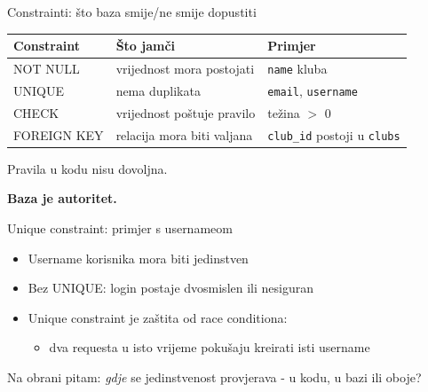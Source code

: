 	\begin{frame}{Constrainti: što baza smije/ne smije dopustiti}
		\begin{center}
			\small
			\begin{tabular}{lll}
				\toprule
				\textbf{Constraint} & \textbf{Što jamči} & \textbf{Primjer} \\
				\midrule
				NOT NULL & vrijednost mora postojati & \texttt{name} kluba \\
				UNIQUE & nema duplikata & \texttt{email}, \texttt{username} \\
				CHECK & vrijednost poštuje pravilo & težina $>$ 0 \\
				FOREIGN KEY & relacija mora biti valjana & \texttt{club\_id} postoji u \texttt{clubs} \\
				\bottomrule
			\end{tabular}
		\end{center}
	\end{frame}

	\begin{frame}{}
		\begin{center}
			{\Large Pravila u kodu nisu dovoljna.}

			\vspace{1em}
			{\huge \textbf{Baza je autoritet.}}
		\end{center}
	\end{frame}
	
	\begin{frame}{Unique constraint: primjer s usernameom}
		\begin{itemize}
			\item Username korisnika mora biti jedinstven
			\item Bez UNIQUE: login postaje dvosmislen ili nesiguran
			\item Unique constraint je zaštita od race conditiona:
			\begin{itemize}
				\item dva requesta u isto vrijeme pokušaju kreirati isti username
			\end{itemize}
		\end{itemize}
		
		\vspace{0.6em}
		Na obrani pitam: \emph{gdje} se jedinstvenost provjerava - u kodu, u bazi ili oboje?
	\end{frame}
	
